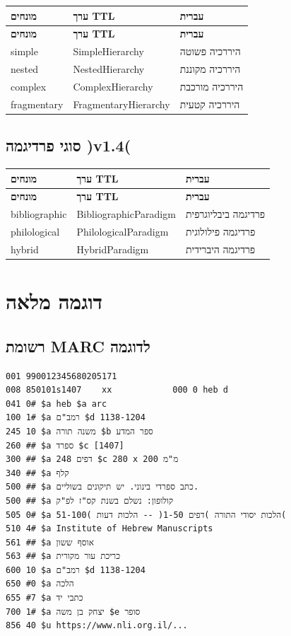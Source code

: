 \documentclass[12pt,a4paper]{article}
\begin{document}
\begin{longtable}{|p{4cm}|L{5cm}|L{7cm}|}
\hline
\textbf{מונחים} & \textbf{ערך TTL} & \textbf{עברית} \\
\hline
\endfirsthead
\hline
\textbf{מונחים} & \textbf{ערך TTL} & \textbf{עברית} \\
\hline
\endhead
\hline
\endfoot
simple & SimpleHierarchy & היררכיה פשוטה \\
\hline
nested & NestedHierarchy & היררכיה מקוננת \\
\hline
complex & ComplexHierarchy & היררכיה מורכבת \\
\hline
fragmentary & FragmentaryHierarchy & היררכיה קטעית \\
\hline
\end{longtable}

\subsection{סוגי פרדיגמה )v1.4(}

\begin{longtable}{|p{4cm}|L{5cm}|L{7cm}|}
\hline
\textbf{מונחים} & \textbf{ערך TTL} & \textbf{עברית} \\
\hline
\endfirsthead
\hline
\textbf{מונחים} & \textbf{ערך TTL} & \textbf{עברית} \\
\hline
\endhead
\hline
\endfoot
bibliographic & BibliographicParadigm & פרדיגמה ביבליוגרפית \\
\hline
philological & PhilologicalParadigm & פרדיגמה פילולוגית \\
\hline
hybrid & HybridParadigm & פרדיגמה היברידית \\
\hline
\end{longtable}

\newpage
\section{דוגמה מלאה}

\subsection{רשומת MARC לדוגמה}

\begin{LTR}
\begin{verbatim}
001 990012345680205171
008 850101s1407    xx            000 0 heb d
041 0# $a heb $a arc
100 1# $a רמב"ם $d 1138-1204
245 10 $a משנה תורה $b ספר המדע
260 ## $a ספרד $c [1407]
300 ## $a 248 דפים $c 280 x 200 מ"מ
340 ## $a קלף
500 ## $a כתב ספרדי בינוני. יש תיקונים בשוליים.
500 ## $a קולופון: נשלם בשנת קס"ז לפ"ק
505 0# $a הלכות יסודי התורה )דפים 1-50( -- הלכות דעות )51-100(
510 4# $a Institute of Hebrew Manuscripts
561 ## $a אוסף ששון
563 ## $a כריכת עור מקורית
600 10 $a רמב"ם $d 1138-1204
650 #0 $a הלכה
655 #7 $a כתבי יד
700 1# $a יצחק בן משה $e סופר
856 40 $u https://www.nli.org.il/...
\end{verbatim}
\end{LTR}
\end{document}
